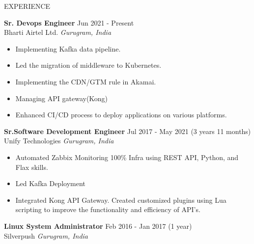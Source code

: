 \documentclass{resume} %
\begin{document}



\begin{rSection}{EXPERIENCE}

\textbf{Sr. Devops Engineer } \hfill Jun 2021 - Present \\
Bharti Airtel Ltd. \hfill \textit{Gurugram, India}
 \begin{itemize}
    \itemsep -3pt {} 
     \item Implementing Kafka data pipeline.
     \item Led the migration of middleware to Kubernetes.
     \item Implementing the CDN/GTM rule in Akamai.
     \item Managing API gateway(Kong)
    \item Enhanced CI/CD process to deploy applications on various platforms.
 \end{itemize}
 
\textbf{Sr.Software Development Engineer} \hfill Jul 2017 - May 2021 (3 years 11 months)\\
Unify Technologies \hfill \textit{Gurugram, India}
 \begin{itemize}
    \itemsep -3pt {} 
     \item Automated Zabbix Monitoring 100\% Infra using REST API, Python, and Flax skills.
     \item Led Kafka Deployment
    \item Integrated Kong API Gateway. Created customized plugins using Lua scripting to improve the functionality and efficiency of API's. 
 \end{itemize}

\textbf{Linux System Administrator} \hfill Feb 2016 - Jan 2017 (1 year)\\
Silverpush \hfill \textit{Gurugram, India}


\end{rSection}
\end{document}

